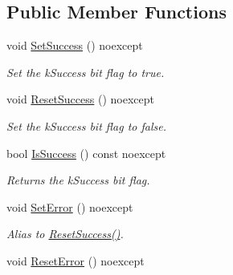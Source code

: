\subsection*{Public Member Functions}
\begin{DoxyCompactItemize}
\item 
\hypertarget{structae_1_1error_1_1_flags_adbb5b192eaf777f86ca7ba817579d06b}{}\label{structae_1_1error_1_1_flags_adbb5b192eaf777f86ca7ba817579d06b} 
void \hyperlink{structae_1_1error_1_1_flags_adbb5b192eaf777f86ca7ba817579d06b}{Set\+Success} () noexcept
\begin{DoxyCompactList}\small\item\em Set the k\+Success bit flag to true. \end{DoxyCompactList}\item 
\hypertarget{structae_1_1error_1_1_flags_a71313318889dccdaf15ab4956afefbaf}{}\label{structae_1_1error_1_1_flags_a71313318889dccdaf15ab4956afefbaf} 
void \hyperlink{structae_1_1error_1_1_flags_a71313318889dccdaf15ab4956afefbaf}{Reset\+Success} () noexcept
\begin{DoxyCompactList}\small\item\em Set the k\+Success bit flag to false. \end{DoxyCompactList}\item 
\hypertarget{structae_1_1error_1_1_flags_a7c28232700cf13cef02bb0ba4c6db15b}{}\label{structae_1_1error_1_1_flags_a7c28232700cf13cef02bb0ba4c6db15b} 
bool \hyperlink{structae_1_1error_1_1_flags_a7c28232700cf13cef02bb0ba4c6db15b}{Is\+Success} () const noexcept
\begin{DoxyCompactList}\small\item\em Returns the k\+Success bit flag. \end{DoxyCompactList}\item 
\hypertarget{structae_1_1error_1_1_flags_a0564df5fa77cd2ef1dd7dcb0ce4105b9}{}\label{structae_1_1error_1_1_flags_a0564df5fa77cd2ef1dd7dcb0ce4105b9} 
void \hyperlink{structae_1_1error_1_1_flags_a0564df5fa77cd2ef1dd7dcb0ce4105b9}{Set\+Error} () noexcept
\begin{DoxyCompactList}\small\item\em Alias to \hyperlink{structae_1_1error_1_1_flags_a71313318889dccdaf15ab4956afefbaf}{Reset\+Success()}. \end{DoxyCompactList}\item 
\hypertarget{structae_1_1error_1_1_flags_a9b13f39f7bbead91006bc776d32cb14e}{}\label{structae_1_1error_1_1_flags_a9b13f39f7bbead91006bc776d32cb14e} 
void \hyperlink{structae_1_1error_1_1_flags_a9b13f39f7bbead91006bc776d32cb14e}{Reset\+Error} () noexcept

\end{DoxyCompactItemize}
